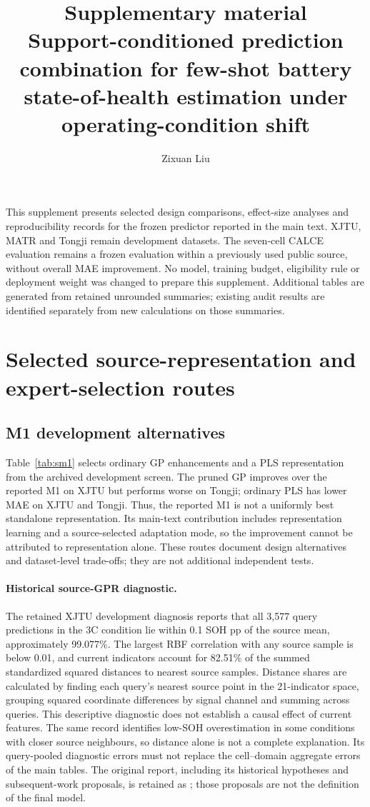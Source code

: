 \documentclass[11pt,a4paper]{article}
\title{Supplementary material\\[5pt]\large Support-conditioned prediction combination for few-shot battery state-of-health estimation under operating-condition shift}
\author{Zixuan Liu}
\date{}
\begin{document}
\maketitle
This supplement presents selected design comparisons, effect-size analyses and reproducibility records for the frozen predictor reported in the main text. XJTU, MATR and Tongji remain development datasets. The seven-cell CALCE evaluation remains a frozen evaluation within a previously used public source, without overall MAE improvement. No model, training budget, eligibility rule or deployment weight was changed to prepare this supplement. Additional tables are generated from retained unrounded summaries; existing audit results are identified separately from new calculations on those summaries.

\section{Selected source-representation and expert-selection routes}
\label{sec:sdevelopment}
\subsection{M1 development alternatives}
Table~\ref{tab:sm1} selects ordinary GP enhancements and a PLS representation from the archived development screen. The pruned GP improves over the reported M1 on XJTU but performs worse on Tongji; ordinary PLS has lower MAE on XJTU and Tongji. Thus, the reported M1 is not a uniformly best standalone representation. Its main-text contribution includes representation learning and a source-selected adaptation mode, so the improvement cannot be attributed to representation alone. These routes document design alternatives and dataset-level trade-offs; they are not additional independent tests.



\paragraph{Historical source-GPR diagnostic.}
The retained XJTU development diagnosis reports that all 3,577 query predictions in the 3C condition lie within 0.1 SOH pp of the source mean, approximately 99.077\%. The largest RBF correlation with any source sample is below 0.01, and current indicators account for 82.51\% of the summed standardized squared distances to nearest source samples. Distance shares are calculated by finding each query's nearest source point in the 21-indicator space, grouping squared coordinate differences by signal channel and summing across queries. This descriptive diagnostic does not establish a causal effect of current features. The same record identifies low-SOH overestimation in some conditions with closer source neighbours, so distance alone is not a complete explanation. Its query-pooled diagnostic errors must not replace the cell--domain aggregate errors of the main tables. The original report, including its historical hypotheses and subsequent-work proposals, is retained as ; those proposals are not the definition of the final model.
\end{document}
